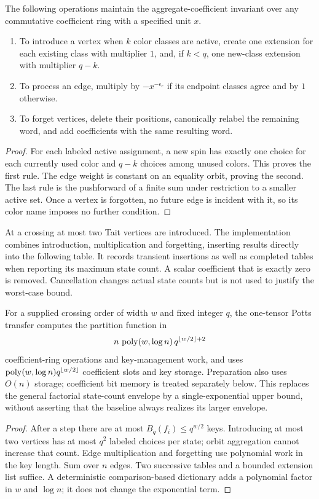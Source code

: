 \begin{proposition}\label{prop:orbit}
The following operations maintain the aggregate-coefficient invariant over
any commutative coefficient ring with a specified unit $x$.
\begin{enumerate}
\item To introduce a vertex when $k$ color classes are active, create one
extension for each existing class with multiplier $1$, and, if $k<q$, one
new-class extension with multiplier $q-k$.
\item To process an edge, multiply by $-x^{-\epsilon_e}$ if its endpoint
classes agree and by $1$ otherwise.
\item To forget vertices, delete their positions, canonically relabel the
remaining word, and add coefficients with the same resulting word.
\end{enumerate}
\end{proposition}
\begin{proof}
For each labeled active assignment, a new spin has exactly one choice for
each currently used color and $q-k$ choices among unused colors. This proves
the first rule. The edge weight is constant on an equality orbit, proving
the second. The last rule is the pushforward of a finite sum under restriction
to a smaller active set. Once a vertex is forgotten, no future edge is
incident with it, so its color name imposes no further condition.
\end{proof}

At a crossing at most two Tait vertices are introduced. The implementation
combines introduction, multiplication and forgetting, inserting results
directly into the following table. It records transient insertions as well
as completed tables when reporting its maximum state count. A scalar
coefficient that is exactly zero is removed. Cancellation changes actual
state counts but is not used to justify the worst-case bound.

\begin{theorem}\label{thm:transfer}
For a supplied crossing order of width $w$ and fixed integer $q$, the
one-tensor Potts transfer computes the partition function in
\[
 n\,\operatorname{poly}(w,\log n)\,q^{\lfloor w/2\rfloor+2}
\]
coefficient-ring operations and key-management work, and uses
$\operatorname{poly}(w,\log n)q^{\lfloor w/2\rfloor}$ coefficient slots and key storage.
Preparation also uses $O(n)$ storage; coefficient bit memory is treated
separately below. This replaces the general factorial state-count envelope
by a single-exponential upper bound, without asserting that the baseline
always realizes its larger envelope.
\end{theorem}
\begin{proof}
After a step there are at most $B_q(f_i)\le q^{w/2}$ keys.
Introducing at most two vertices has at most $q^2$ labeled choices per
state; orbit aggregation cannot increase that count. Edge multiplication
and forgetting use polynomial work in the key length. Sum over $n$ edges.
Two successive tables and a bounded extension list suffice.
A deterministic comparison-based dictionary adds a polynomial factor in
$w$ and $\log n$; it does not change the exponential term.
\end{proof}

